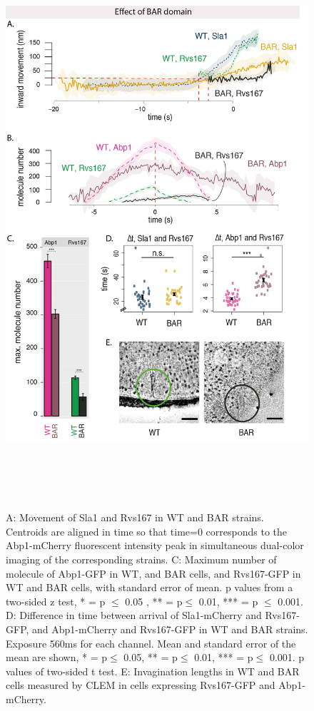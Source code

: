 \begin{figure}
	\centering
	\includegraphics[width=21cm,height=21cm,keepaspectratio]{figures/results_final/delsh3_8}
	\caption [Effect of the Rvs167 SH3 deletion]
	{A: Movement of Sla1 and Rvs167 in WT and BAR strains. Centroids are aligned in time so that time=0 corresponds to the Abp1-mCherry fluorescent intensity peak in simultaneous dual-color imaging of the corresponding strains. 
	C: Maximum number of molecule of Abp1-GFP in WT, and BAR cells, and Rvs167-GFP in WT and BAR cells, with standard error of mean. p values from a two-sided z test, * = p $\leq$ 0.05 , ** = p$\leq$ 0.01, *** = p $\leq$ 0.001. 
	D: Difference in time between arrival of Sla1-mCherry and Rvs167-GFP, and Abp1-mCherry and Rvs167-GFP in WT and BAR strains. Exposure 560ms for each channel. Mean and standard error of the mean are shown, * = p$\leq$ 0.05, ** = p$\leq$ 0.01, *** = p$\leq$ 0.001. p values of two-sided t test.
	E: Invagination lengths in WT and BAR cells measured by CLEM in cells expressing Rvs167-GFP and Abp1-mCherry. 
	\label{fig2_sh3del}}

	\end{figure}
	\vspace{5mm}
	

